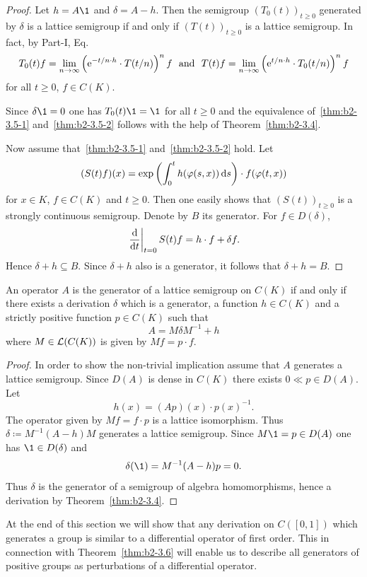 \begin{proof}
Let $h = A\1$ and $\delta = A - h$.
Then the semigroup $(T_{0}(t))_{t \geq 0}$ generated by $\delta$ is a lattice semigroup if and only if\/ $(T(t))_{t \geq 0}$ is a lattice semigroup. In fact, by 
Part-I, Eq.~ %
\[
T_{0}(t)f = \lim_{n \to \infty} \left(\mathrm{e}^{-t/n \cdot h} \cdot T(t/n)\right)^{n}f 
\ \text{ and }\  
 T(t)f = \lim_{n \to \infty} \left(\mathrm{e}^{{t/n} \cdot h} \cdot T_{0}(t/n)\right)^{n}f
\]
 for all $t \geq 0$, $f \in C(K)$.

Since $\delta \1 = 0$ one has $T_{0}(t)\1 = \1$ for all $t \geq 0$ and the equivalence of~\ref{thm:b2-3.5-1} and~\ref{thm:b2-3.5-2} follows with the help of Theorem~\ref{thm:b2-3.4}.

Now assume that~\ref{thm:b2-3.5-1} and~\ref{thm:b2-3.5-2} hold.
Let
\[
(S(t)f) (x) = \exp\left( \int_{0}^{t} h(\phi(s,x))\ds \right) \cdot f(\phi(t,x))
\]
for $x \in K$, $f \in C (K)$ and $t \geq 0$. 
Then one easily shows that $(S(t))_{t\geq 0}$ is a strongly con\-tinu\-ous semigroup.
Denote by $B$ its generator.
For $f \in D(\delta)$, 
%
\[
	 \left.\frac{\mathop{}\!\mathrm{d}{}}{\mathop{}\!\mathrm{d}{t}}\right\vert_{t = 0}S(t)f = h \cdot f + \delta f .
\]
%
Hence $\delta + h \subseteq B$.  
Since $\delta + h$ also is a generator, it follows that $\delta + h = B$.
\end{proof}%
\begin{theorem}\label{thm:b2-3.6}
An operator $A$ is the generator of a lattice semigroup on $C(K)$ if and only if there exists a derivation $\delta$ which is a generator, a function $h \in C(K)$ and a strictly positive function $p \in C(K)$ such that
\begin{equation} \label{eq:b2-3.7}
A = M\delta M^{-1} + h
\end{equation}
where $M \in \mathcal{L}(C(K))$ is given by $Mf = p \cdot f$.
\end{theorem}
\begin{proof}
In order to show the non-trivial implication assume that $A$ generates a lattice semigroup.
Since $D(A)$ is dense in $C(K)$ there exists $0 \ll p \in D(A)$.
Let 
%
\[
	h(x) = (Ap)(x) \cdot p(x)^{-1}.
\]
%
The operator given by $Mf = f \cdot p$ is a lattice isomorphism.
Thus $\delta \coloneq M^{-1}(A - h)M$ generates a lattice semigroup.
Since $M\1 = p \in D(A)$ one has $\1 \in D(\delta)$ and %
\[
	\delta(\1) = M^{-1}(A - h)p = 0.
\]
%
Thus $\delta$ is the generator of a semigroup of algebra homomorphisms, hence a derivation by Theorem~\ref{thm:b2-3.4}.
\end{proof}
At the end of this section we will show that any derivation on $C([0,1])$ which generates a group is similar to a differential operator of first order.
This in connection with Theorem~\ref{thm:b2-3.6} will enable us to describe all generators of positive groups as perturbations of a differential operator.

